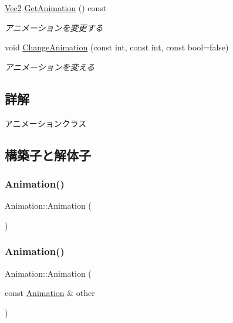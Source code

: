\begin{DoxyCompactItemize}
\mbox{\hyperlink{common_8h_ae148fff5818e9444b4ab2288829559bf}{Vec2}} \mbox{\hyperlink{class_animation_a313060e5a143cb24d0264744249fddd6}{Get\+Animation}} () const
\begin{DoxyCompactList}\small\item\em アニメーションを変更する \end{DoxyCompactList}\item 
void \mbox{\hyperlink{class_animation_ae9fe84bd92b1df395dd09aeed37a8373}{Change\+Animation}} (const int, const int, const bool=false)
\begin{DoxyCompactList}\small\item\em アニメーションを変える \end{DoxyCompactList}\end{DoxyCompactItemize}


\subsection{詳解}
アニメーションクラス 

\subsection{構築子と解体子}
\mbox{\label{class_animation_a83f0a16cef7117f187ad596de38dd9d6}} 
\subsubsection{\texorpdfstring{Animation()}{Animation()}\hspace{0.1cm}{\footnotesize\ttfamily [1/2]}}
{\footnotesize\ttfamily Animation\+::\+Animation (\begin{DoxyParamCaption}{ }\end{DoxyParamCaption})\hspace{0.3cm}{\ttfamily [inline]}}

\mbox{\label{class_animation_a7c1388a1e58fb80682aa8e147f58d592}} 
\subsubsection{\texorpdfstring{Animation()}{Animation()}\hspace{0.1cm}{\footnotesize\ttfamily [2/2]}}
{\footnotesize\ttfamily Animation\+::\+Animation (\begin{DoxyParamCaption}\item[{const \mbox{\hyperlink{class_animation}{Animation}} \&}]{other }\end{DoxyParamCaption})\hspace{0.3cm}{\ttfamily [inline]}}



